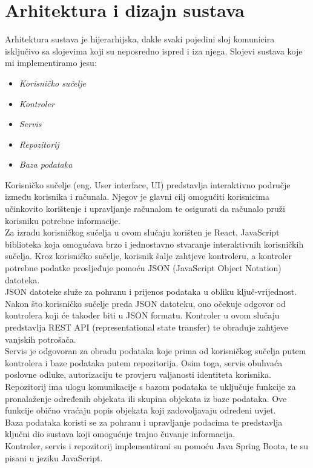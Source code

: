 \chapter{Arhitektura i dizajn sustava}

		{ Arhitektura sustava je hijerarhijska, dakle svaki pojedini sloj
			komunicira isključivo sa slojevima koji su neposredno ispred i iza njega. Slojevi sustava koje mi implementiramo jesu:}
	\begin{itemize}
		\item 	\textit{Korisničko sučelje}
		\item 	\textit{Kontroler}
		\item 	\textit{Servis}
		\item 	\textit{Repozitorij}
		\item 	\textit{Baza podataka}
	\end{itemize}

		{Korisničko sučelje (eng. User interface, UI) predstavlja interaktivno područje između korisnika i računala. Njegov je glavni cilj omogućiti korisnicima učinkovito korištenje i upravljanje računalom te osigurati da računalo pruži korisniku potrebne informacije.\\

			Za izradu korisničkog sučelja u ovom slučaju korišten je React, JavaScript biblioteka koja omogućava brzo i jednostavno stvaranje interaktivnih korisničkih sučelja. Kroz korisničko sučelje, korisnik šalje zahtjeve kontroleru, a kontroler potrebne podatke prosljeđuje pomoću JSON (JavaScript Object Notation) datoteka.\\

			JSON datoteke služe za pohranu i prijenos podataka u obliku ključ-vrijednost. Nakon što korisničko sučelje preda JSON datoteku, ono očekuje odgovor od kontrolera koji će također biti u JSON formatu. Kontroler u ovom slučaju predstavlja REST API (representational state transfer) te obrađuje zahtjeve vanjskih potrošača.\\

			Servis je odgovoran za obradu podataka koje prima od korisničkog sučelja putem kontrolera i baze podataka putem repozitorija. Osim toga, servis obuhvaća poslovne odluke, autorizaciju te provjeru valjanosti identiteta korisnika.\\

			Repozitorij ima ulogu komunikacije s bazom podataka te uključuje funkcije za pronalaženje određenih objekata ili skupina objekata iz baze podataka. Ove funkcije obično vraćaju popis objekata koji zadovoljavaju određeni uvjet.\\

			Baza podataka koristi se za pohranu i upravljanje podacima te predstavlja ključni dio sustava koji omogućuje trajno čuvanje informacija.\\

			Kontroler, servis i repozitorij implementirani su pomoću Java Spring Boota, te su pisani u jeziku JavaScript.}


